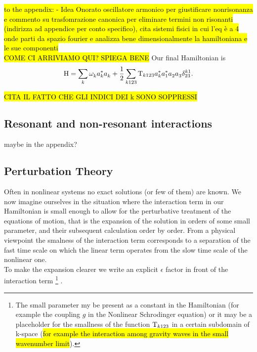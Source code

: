 \hl{to the appendix: - Idea Onorato oscillatore armonico per giustificare nonrisonanza e commento su trasfomrazione canonica per eliminare termini 
non risonanti (indirizza ad appendice per conto specifico), cita sistemi fisici in cui l'eq è a 4 onde
parti da spazio fourier e analizza bene dimensionalmente la hamiltoniana e le sue componenti} \\
\hl{COME CI ARRIVIAMO QUI? SPIEGA BENE}
Our final Hamiltonian is 
\begin{equation}
    \mathrm{H} = \sum_k \omega^{}_k a_k^{*} a_k^{} + \frac{1}{2} \sum_{k123} \mathrm{T}_{k123} a_k^{*} a_1^{*} a_2^{} a_3^{} \delta_{23}^{k1}.
    \label{ham4}
\end{equation}

\hl{CITA IL FATTO CHE GLI INDICI DEI k SONO SOPPRESSI}
\subsection{Resonant and non-resonant interactions}
maybe in the appendix?

\subsection{Perturbation Theory}
Often in nonlinear systems no exact solutions (or few of them) are known. We now imagine ourselves in the situation where the interaction term in our Hamiltonian 
is small enough to allow for the perturbative treatment of the equations of motion, that is the expansion of the solution in orders of some small parameter, 
and their subsequent calculation order by order. From a physical viewpoint the smalness of the interaction term corresponds to a 
separation of the fast time scale on which the linear term operates from the slow time scale of the nonlinear one.\\
 To make the expansion clearer we write an explicit $\epsilon$ factor in front of the interaction term
\footnote{The small parameter my be present as a constant in the Hamiltonian (for example the coupling $g$ in the Nonlinear Schrodinger equation) or 
it may be a placeholder for the smallness of the function $\mathrm{T}_{k123}$ in a certain subdomain of k-space (\hl{for example the interaction among gravity waves in 
the small wavenumber limit}). } . \\

